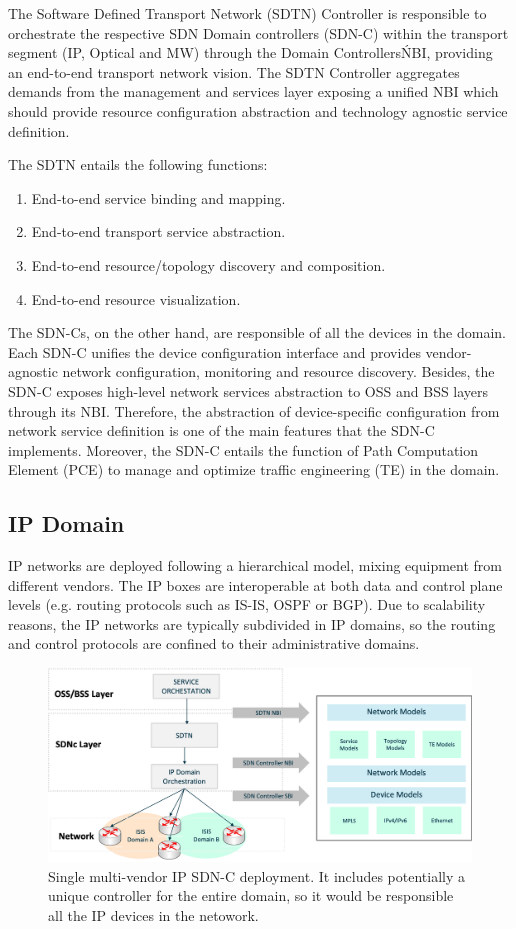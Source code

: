 \documentclass[a4paper,fleqn]{cas-dc}
\begin{document}
The Software Defined Transport Network (SDTN) Controller is responsible to orchestrate the respective SDN Domain controllers (SDN-C) within the transport segment (IP, Optical and MW) through the Domain Controllers\'NBI, providing an end-to-end transport network vision. The SDTN Controller aggregates demands from the management and services layer exposing a unified NBI which should provide resource configuration abstraction and technology agnostic service definition. 

The SDTN entails the following functions: 
\begin{enumerate}
    \item End-to-end service binding and mapping.
    \item End-to-end transport service abstraction.
    \item End-to-end resource/topology discovery and composition.
    \item End-to-end resource visualization.
\end{enumerate}

The SDN-Cs, on the other hand, are responsible of all the devices in the domain. Each SDN-C unifies the device configuration interface and provides vendor-agnostic network configuration, monitoring and resource discovery. Besides, the SDN-C exposes high-level network services abstraction to OSS and BSS layers through its NBI. Therefore, the abstraction of device-specific configuration from network service definition is one of the main features that the SDN-C implements. Moreover, the SDN-C entails the function of Path Computation Element (PCE) to manage and optimize traffic engineering (TE) in the domain.

\subsection {IP Domain}
\label{section:ip}
IP networks are deployed following a hierarchical model, mixing equipment from different vendors. The IP boxes are interoperable at both data and control plane levels (e.g. routing protocols such as IS-IS, OSPF or BGP). Due to scalability reasons, the IP networks are typically subdivided in IP domains, so the routing and control protocols are confined to their administrative domains.

\begin{figure}
	\centering
		\includegraphics[scale=0.5]{figs/ifusion_multidomain_2.png}
	\caption{Single multi-vendor IP SDN-C deployment. It includes potentially a unique controller for the entire domain, so it would be responsible all the IP devices in the netowork.}
	\label{FIG:2}
\end{figure}
\end{document}
